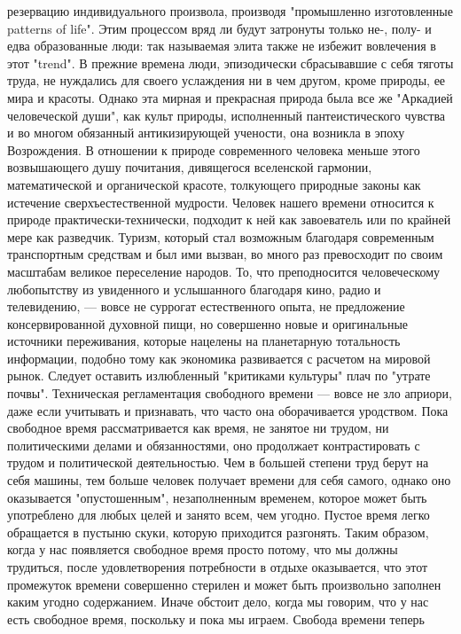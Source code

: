 \documentclass[12pt]{article}
\begin{document}
резервацию  индивидуального  произвола,  производя  "промышленно  изготовленные  patterns  of  life".  Этим
процессом вряд ли будут затронуты только не-, полу- и едва образованные люди: так называемая элита также не
избежит вовлечения в этот "trend". В прежние времена люди, эпизодически сбрасывавшие с себя тяготы труда,
не нуждались для своего услаждения ни в чем другом, кроме природы, ее мира и красоты. Однако эта мирная и
прекрасная  природа  была  все  же  "Аркадией  человеческой  души",  как  культ  природы,  исполненный
пантеистического  чувства  и  во  многом  обязанный  антикизирующей  учености,  она  возникла  в  эпоху
Возрождения. В отношении к природе современного человека меньше этого возвышающего душу почитания,
дивящегося вселенской гармонии, математической и органической красоте, толкующего природные законы как
истечение  сверхъестественной  мудрости.  Человек  нашего  времени  относится  к  природе  практически-технически,  подходит  к  ней  как  завоеватель  или  по  крайней  мере  как  разведчик.  Туризм,  который  стал
возможным благодаря современным транспортным средствам и был ими вызван, во много раз превосходит по
своим  масштабам  великое  переселение  народов.  То,  что  преподносится  человеческому  любопытству  из
увиденного и услышанного благодаря кино, радио и телевидению, --- вовсе не суррогат естественного опыта, не
предложение  консервированной  духовной  пищи,  но  совершенно  новые  и  оригинальные  источники
переживания,  которые  нацелены  на  планетарную  тотальность  информации,  подобно  тому  как  экономика
развивается с расчетом на мировой рынок. Следует оставить излюбленный "критиками культуры" плач по
"утрате почвы". Техническая регламентация свободного времени --- вовсе не зло априори, даже если учитывать и
признавать, что часто она оборачивается уродством. Пока свободное время рассматривается как время, не
занятое ни трудом, ни политическими делами и обязанностями, оно продолжает контрастировать с трудом и
политической деятельностью. Чем в большей степени труд берут на себя машины, тем больше человек получает
времени для себя самого, однако оно оказывается "опустошенным", незаполненным временем, которое может
быть употреблено для любых целей и занято всем, чем угодно. Пустое время легко обращается в пустыню
скуки, которую приходится разгонять. Таким образом, когда у нас появляется свободное время просто потому,
что мы должны трудиться, после удовлетворения потребности в отдыхе оказывается, что этот промежуток
времени совершенно стерилен и может быть произвольно заполнен каким угодно содержанием. Иначе обстоит
дело, когда мы говорим, что у нас есть свободное время, поскольку и пока мы играем. Свобода времени теперь
\end{document}

